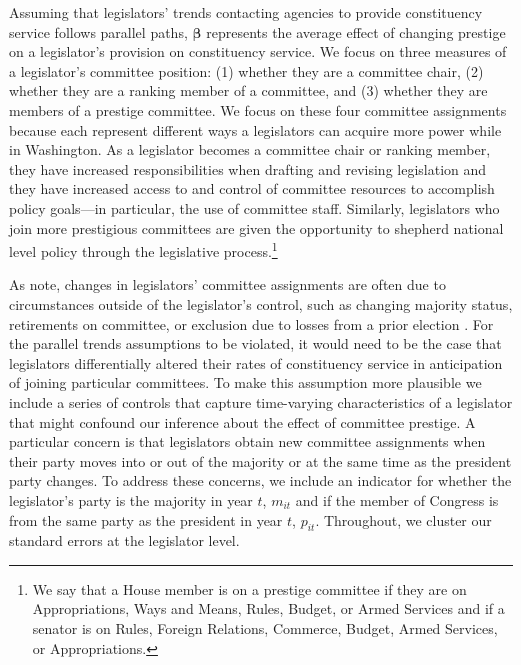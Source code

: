 \documentclass[12pt]{article}
\begin{document}
Assuming that legislators' trends contacting agencies to provide constituency service follows parallel paths, $\boldsymbol{\beta}$ represents the average effect of changing prestige on a legislator's provision on constituency service.  We focus on three measures of a legislator's committee position: (1) whether they are a committee chair, (2) whether they are a ranking member of a committee, and (3) whether they are members of a prestige committee.  We focus on these four committee assignments because each represent different ways a legislators can acquire more power while in Washington.  As a legislator becomes a committee chair or ranking member, they have increased responsibilities when drafting and revising legislation and they have increased access to and control of committee resources to accomplish policy goals---in particular, the use of committee staff.  Similarly, legislators who join more prestigious committees are given the opportunity to shepherd national level policy through the legislative process.\footnote{We say that a House member is on a prestige committee if they are on Appropriations, Ways and Means, Rules, Budget, or Armed Services and if a senator is on Rules, Foreign Relations, Commerce, Budget, Armed Services, or Appropriations.} 

As \cite{BerryFowler2016} note, changes in legislators' committee assignments are often due to circumstances outside of the legislator's control, such as changing majority status, retirements on committee, or exclusion due to losses from a prior election \citep{GrimmerPowell2013}.  For the parallel trends assumptions to be violated, it would need to be the case that legislators differentially altered their rates of constituency service in anticipation of joining particular committees. To make this assumption more plausible we include a series of controls that capture time-varying characteristics of a legislator that might confound our inference about the effect of committee prestige. A particular concern is that legislators obtain new committee assignments when their party moves into or out of the majority or at the same time as the president party changes.  To address these concerns, we include an indicator for whether the legislator's party is the majority in year $t$, $m_{it}$ and if the member of Congress is from the same party as the president in year $t$, $p_{it}$.  Throughout, we cluster our standard errors at the legislator level.
\end{document}
